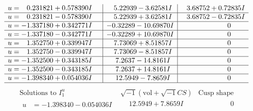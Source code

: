 \documentclass[1p]{elsarticle_modified}
\theoremstyle{definition}
\newcommand{\I}{\sqrt{-1}}
\begin{document}
$$\begin{array}{c|c|c}
\begin{aligned}
u &= \phantom{-}0.231821 + 0.578390 I\end{aligned}
 & \phantom{-}5.22939 - 3.62581 I & \phantom{-}3.68752 + 0.72835 I \\ \hline\begin{aligned}
u &= \phantom{-}0.231821 - 0.578390 I\end{aligned}
 & \phantom{-}5.22939 + 3.62581 I & \phantom{-}3.68752 - 0.72835 I \\ \hline\begin{aligned}
u &= -1.337180 + 0.342771 I\end{aligned}
 & -0.32289 - 10.69870 I & \phantom{-0.000000 } 0 \\ \hline\begin{aligned}
u &= -1.337180 - 0.342771 I\end{aligned}
 & -0.32289 + 10.69870 I & \phantom{-0.000000 } 0 \\ \hline\begin{aligned}
u &= \phantom{-}1.352750 + 0.339947 I\end{aligned}
 & \phantom{-}7.73069 + 8.51857 I & \phantom{-0.000000 } 0 \\ \hline\begin{aligned}
u &= \phantom{-}1.352750 - 0.339947 I\end{aligned}
 & \phantom{-}7.73069 - 8.51857 I & \phantom{-0.000000 } 0 \\ \hline\begin{aligned}
u &= -1.352500 + 0.343185 I\end{aligned}
 & \phantom{-}7.2637 - 14.8161 I & \phantom{-0.000000 } 0 \\ \hline\begin{aligned}
u &= -1.352500 - 0.343185 I\end{aligned}
 & \phantom{-}7.2637 + 14.8161 I & \phantom{-0.000000 } 0 \\ \hline\begin{aligned}
u &= -1.398340 + 0.054036 I\end{aligned}
 & \phantom{-}12.5949 - 7.8659 I & \phantom{-0.000000 } 0\\
 \hline 
 \end{array}$$\newpage$$\begin{array}{c|c|c}  
\text{Solutions to }I^u_{1}& \I (\text{vol} + \sqrt{-1}CS) & \text{Cusp shape}\\
 \hline 
\begin{aligned}
u &= -1.398340 - 0.054036 I\end{aligned}
 & \phantom{-}12.5949 + 7.8659 I & \phantom{-0.000000 } 0 \\ \hline\begin{aligned}

\end{aligned}
\end{array}$$
\end{document}
